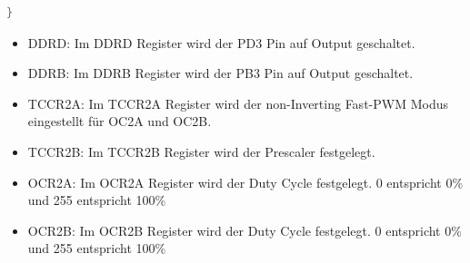 \begin{itemize}
\begin{lstlisting}[caption=$\mu$C-Programm,language=c]
}
\end{lstlisting}

\begin{itemize}
\item DDRD: Im DDRD Register wird der PD3 Pin auf Output geschaltet.\\
\item DDRB: Im DDRB Register wird der PB3 Pin auf Output geschaltet.\\
\item TCCR2A: Im TCCR2A Register wird der non-Inverting Fast-PWM Modus eingestellt für OC2A und OC2B. \\
\item TCCR2B: Im TCCR2B Register wird der Prescaler festgelegt. \\
\item OCR2A: Im OCR2A Register wird der Duty Cycle festgelegt. 0 entspricht 0\% und 255 entspricht 100\% \\
\item OCR2B: Im OCR2B Register wird der Duty Cycle festgelegt. 0 entspricht 0\% und 255 entspricht 100\% \\
\end{itemize}

\end{itemize}
\newpage
